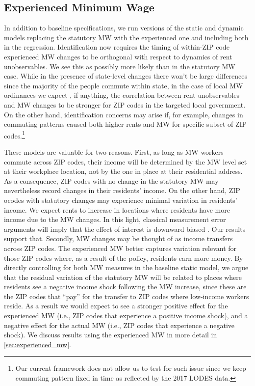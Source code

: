 \subsection{Experienced Minimum Wage}\label{sec:emp_strategy_expmw}

In addition to baseline specifications, we run versions of the static and dynamic models 
replacing the statutory MW with the experienced one and including both in 
the regression. Identification now requires the timing of within-ZIP code 
experienced MW changes to be orthogonal with respect to dynamics of rent
unobservables. We see this as possibly more likely than in the statutory MW case. 
While in the presence of state-level changes there won't be large differences since the
majority of the people commute within state, in the case of local MW ordinances we expect 
, if anything, the correlation between rent unobservables and MW changes to be stronger for
ZIP codes in the targeted local government. On the other hand, identification concerns may arise 
if, for example, changes in commuting patterns caused both higher rents and MW for specific 
subset of ZIP codes.\footnote{Our current framework does not allow us to test for such issue
since we keep commuting pattern fixed in time as reflected by the 2017 LODES data.}

These models are valuable for two reasons. First, as long as MW workers commute across ZIP codes, 
their income will be determined by the 
MW level set at their workplace location, not by the one in place at their residential address.
As a consequence, ZIP codes with no change in 
the statutory MW may nevertheless record changes in their residents' income. On the other hand, 
ZIP ocodes with statutory changes may experience minimal variation in residents' income. 
We expect rents to increase in locations where residents have more income due to the MW 
changes. In this light, classical measurement error arguments will imply that the effect of 
interest is downward biased \parencite{AngristPischke2009}. Our results support that.  Secondly, 
MW changes may be thought of as income transfers across ZIP codes. 
The experienced MW better captures variation relevant for those ZIP codes 
where, as a result of the policy, residents earn more money. 
By directly controlling for both MW measures in the baseline static model, 
we argue that the residual variation of the statutory MW will be related to places where 
residents see a negative income shock following the MW increase, since these are the 
ZIP codes that ``pay'' for the transfer to ZIP codes where low-income workers reside. 
As a result we would expect to see a stronger positive effect for the experienced MW 
(i.e., ZIP codes that experience a positive income shock), and a negative effect for 
the actual MW (i.e., ZIP codes that experience a negative shock). We discuss results using the 
experienced MW in more detail in \autoref{sec:experienced_mw}.




